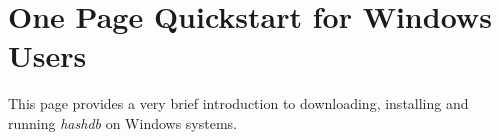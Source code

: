 \documentclass[11pt,fleqn]{article} %
\begin{document}
\newcommand \hash {\textit{hashdb}\xspace}
\newcommand \hdb {\textit{hashdb}\xspace}
\newcommand \bulk {\textbf{bulk\_extractor}\xspace}
\newcommand \mdd {\textbf{md5deep}\xspace}
\newcommand \fiwalk {\textbf{fiwalk}\xspace}





\setlength{\parindent}{0pt} %
\newpage
\thispagestyle{empty}
\mbox{}
\newpage

\section*{One Page Quickstart for Windows Users}
 This page provides a very brief introduction to downloading, installing and running \hash on Windows systems. 
\end{document}
